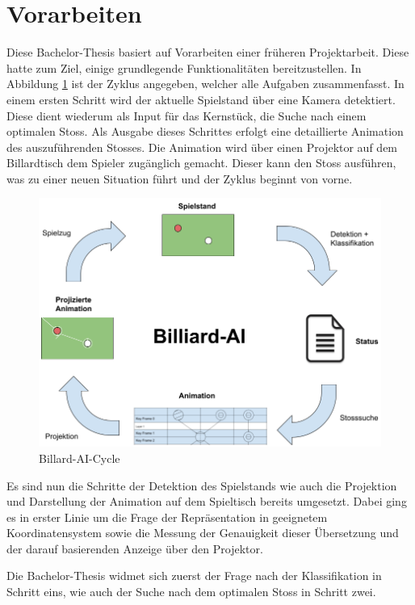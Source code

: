 \section{Vorarbeiten}\label{kap:vorarbeiten}
Diese Bachelor-Thesis basiert auf Vorarbeiten einer früheren Projektarbeit. Diese hatte zum Ziel, einige
grundlegende Funktionalitäten bereitzustellen. In Abbildung \ref{fig:billiard_ai_cycle} ist der Zyklus angegeben,
welcher alle Aufgaben zusammenfasst. In einem ersten Schritt wird der aktuelle Spielstand über eine Kamera detektiert.
Diese dient wiederum als Input für das Kernstück, die Suche nach einem optimalen Stoss.
Als Ausgabe dieses Schrittes erfolgt eine detaillierte Animation des auszuführenden Stosses.
Die Animation wird über einen Projektor auf dem Billardtisch dem Spieler zugänglich gemacht. Dieser kann den Stoss ausführen,
was zu einer neuen Situation führt und der Zyklus beginnt von vorne.

\begin{figure}[h!]
    \begin{center}
        \includegraphics[width=0.8\linewidth]{../common/03_billiard_ai/resources/19_billiard_ai_cycle.png}
    \end{center}
    \caption{Billard-AI-Cycle}
    \label{fig:billiard_ai_cycle}
\end{figure}

Es sind nun die Schritte der Detektion des Spielstands wie auch die Projektion und Darstellung der Animation auf dem
Spieltisch bereits umgesetzt. Dabei ging es in erster Linie um die Frage der Repräsentation in geeignetem Koordinatensystem
sowie die Messung der Genauigkeit dieser Übersetzung und der darauf basierenden Anzeige über den Projektor.

Die Bachelor-Thesis widmet sich zuerst der Frage nach der Klassifikation in Schritt eins, wie auch der Suche
nach dem optimalen Stoss in Schritt zwei.